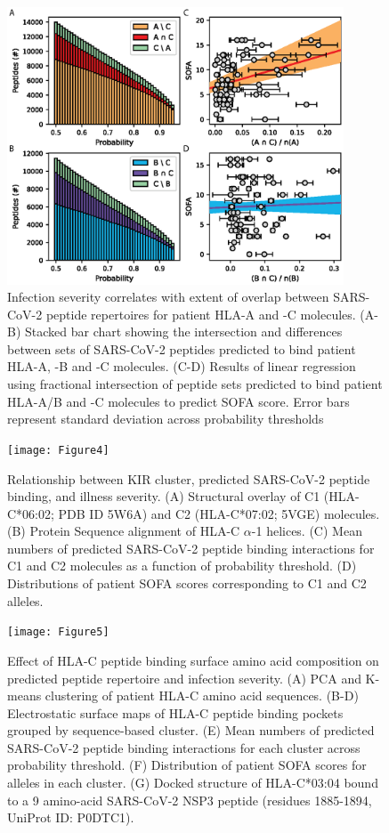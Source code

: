 \documentclass[utf8]{frontiersinFPHY_FAMS} %
\begin{document}
\begin{figure}[h!]
\begin{center}
\includegraphics[width=10cm]{Figure3}%
\end{center}
\caption{Infection severity correlates with extent of overlap between SARS-CoV-2 peptide repertoires for patient HLA-A and -C molecules. (A-B) Stacked bar chart showing the intersection and differences between sets of SARS-CoV-2 peptides predicted to bind patient HLA-A, -B and -C molecules. (C-D) Results of linear regression using fractional intersection of peptide sets predicted to bind patient HLA-A/B and -C molecules to predict SOFA score. Error bars represent standard deviation across probability thresholds}\label{fig:3}
\end{figure}

\begin{figure}[h!]
\begin{center}
\texttt{[image: Figure4]}%
\end{center}
\caption{Relationship between KIR cluster, predicted SARS-CoV-2 peptide binding, and illness severity. (A) Structural overlay of C1 (HLA-C*06:02; PDB ID 5W6A) and C2 (HLA-C*07:02; 5VGE) molecules. (B) Protein Sequence alignment of HLA-C $\alpha$-1 helices. (C) Mean numbers of predicted SARS-CoV-2 peptide binding interactions for C1 and C2 molecules as a function of probability threshold. (D) Distributions of patient SOFA scores corresponding to C1 and C2 alleles.}\label{fig:4}
\end{figure}

\begin{figure}[h!]
\begin{center}
\texttt{[image: Figure5]}%
\end{center}
\caption{Effect of HLA-C peptide binding surface amino acid composition on predicted peptide repertoire and infection severity. (A) PCA and K-means clustering of patient HLA-C amino acid sequences. (B-D) Electrostatic surface maps of HLA-C peptide binding pockets grouped by sequence-based cluster. (E) Mean numbers of predicted SARS-CoV-2 peptide binding interactions for each cluster across probability threshold. (F) Distribution of patient SOFA scores for alleles in each cluster. (G) Docked structure of HLA-C*03:04 bound to a 9 amino-acid SARS-CoV-2 NSP3 peptide (residues 1885-1894, UniProt ID: P0DTC1).}\label{fig:5}
\end{figure}
\end{document}
